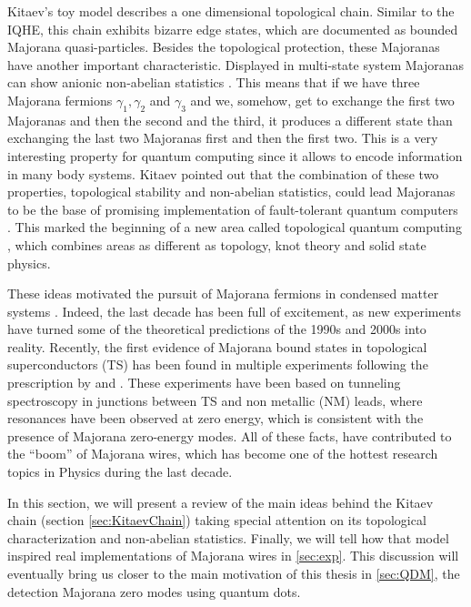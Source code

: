 Kitaev's toy model describes a one dimensional  topological chain. Similar to the IQHE, this chain exhibits bizarre edge states, which are documented as bounded Majorana quasi-particles. Besides the topological protection, these Majoranas have another important characteristic. Displayed in multi-state system Majoranas can show anionic non-abelian statistics \citep{kitaev_fault-tolerant_2003}. This means that if we have three Majorana fermions $\gamma_1 ,\gamma_2 $ and $\gamma_3$ and we, somehow, get to exchange the first two Majoranas and then the second and the third, it produces a different state than exchanging the last two Majoranas first and then the first two. This is a very interesting property for quantum computing since it allows to encode information in many body systems.  Kitaev pointed out that the combination of these two properties, topological stability and non-abelian statistics, could lead Majoranas to be the base of promising  implementation of fault-tolerant quantum computers \citep{kitaev_fault-tolerant_2001}. This marked the beginning of a new area called  topological quantum computing \cite{pachos_introduction_2012}, which combines areas as different as topology, knot theory \cite{turaev_book} and solid state physics. 

These ideas motivated the pursuit of Majorana fermions in condensed matter systems \citep{fu_superconducting_2008,sato_non-abelian_2009,alicea_new_2012,beenakker_search_2013}. Indeed, the last decade has been full of excitement, as new experiments have turned some of the theoretical predictions of the 1990s and 2000s into reality. Recently, the first evidence of Majorana bound states
in topological superconductors (TS) has been found in multiple experiments \citep{mourik_signatures_2012,das_zero-bias_2012,deng_anomalous_2012,deng_majorana_2016,zhang_quantized_2018}
following the prescription by \citet{oreg_helical_2010} and \citet{lutchyn_majorana_2010}. These experiments have been based on tunneling spectroscopy in junctions between TS and non metallic (NM) leads, where resonances have been
observed at zero energy, which is consistent with the presence of Majorana zero-energy modes. All of these facts, have contributed to the ``boom'' of Majorana wires, which has become one of the hottest research topics in Physics during the last decade. 

In this section, we will present a review of the main ideas behind the Kitaev chain (section \ref{sec:KitaevChain}) taking special attention on its topological characterization and non-abelian statistics. Finally, we will tell how that model inspired real implementations of Majorana wires in \ref{sec:exp}. This discussion will eventually bring us closer  to the main motivation of this thesis in \ref{sec:QDM}, the detection Majorana zero modes using quantum dots. 

